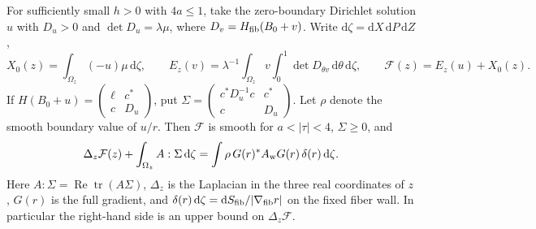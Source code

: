 For sufficiently small $h>0$ with $4a\le1$, take the zero-boundary Dirichlet solution $u$ with $D_u>0$ and $\det D_u=\lambda\mu$, where $D_v=H_{\rm fib}(B_0+v)$. Write $\mathrm d\zeta=\mathrm dX\,\mathrm dP\,\mathrm dZ$,
\[
 X_0(z)=\int_{\Omega_z}(-u)\mu\,\mathrm d\zeta,\qquad
 E_z(v)=\lambda^{-1}\int_{\Omega_z}v\int_0^1\det D_{\theta v}\,\mathrm d\theta\,\mathrm d\zeta,\qquad
 \mathcal F(z)=E_z(u)+X_0(z).
\]
If $H(B_0+u)=\begin{pmatrix}\ell&c^*\\c&D_u\end{pmatrix}$, put
$\Sigma=\begin{pmatrix}c^*D_u^{-1}c&c^*\\c&D_u\end{pmatrix}$.
Let $\rho$ denote the smooth boundary value of $u/r$. Then $\mathcal F$ is smooth for $a<|\tau|<4$, $\Sigma\ge0$, and
\[
 \Delta_z\mathcal F(z)+\int_{\Omega_z} A:\Sigma\,\mathrm d\zeta
 =\int \rho\, G(r)^*A_{\rm w}G(r)\,\delta(r)\,\mathrm d\zeta .
\]
Here $A:\Sigma=\operatorname{Re}\operatorname{tr}(A\Sigma)$, $\Delta_z$ is the Laplacian in the three real coordinates of $z$, $G(r)$ is the full gradient, and $\delta(r)\,\mathrm d\zeta=\mathrm dS_{\rm fib}/|\nabla_{\rm fib}r|$ on the fixed fiber wall. In particular the right-hand side is an upper bound on $\Delta_z\mathcal F$.
